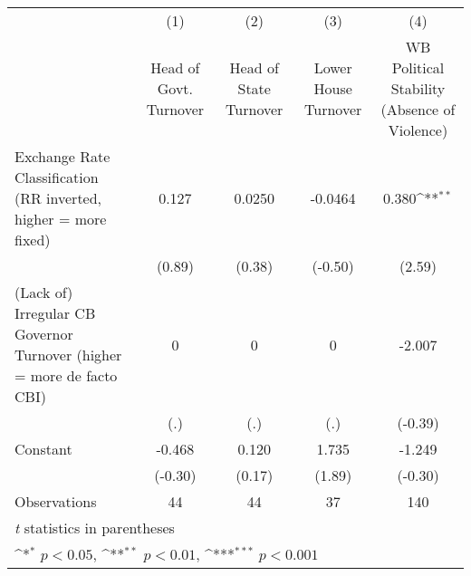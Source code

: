 {
\def\sym#1{\ifmmode^{#1}\else\(^{#1}\)\fi}
\begin{tabular}{l*{4}{c}}
\hline\hline
                &\multicolumn{1}{c}{(1)}&\multicolumn{1}{c}{(2)}&\multicolumn{1}{c}{(3)}&\multicolumn{1}{c}{(4)}\\
                &\multicolumn{1}{c}{Head of Govt. Turnover}&\multicolumn{1}{c}{Head of State Turnover}&\multicolumn{1}{c}{Lower House Turnover}&\multicolumn{1}{c}{WB Political Stability (Absence of Violence)}\\
\hline
Exchange Rate Classification (RR inverted, higher = more fixed)&    0.127         &   0.0250         &  -0.0464         &    0.380\sym{**} \\
                &   (0.89)         &   (0.38)         &  (-0.50)         &   (2.59)         \\
[1em]
(Lack of) Irregular CB Governor Turnover (higher = more de facto CBI)&        0         &        0         &        0         &   -2.007         \\
                &      (.)         &      (.)         &      (.)         &  (-0.39)         \\
[1em]
Constant        &   -0.468         &    0.120         &    1.735         &   -1.249         \\
                &  (-0.30)         &   (0.17)         &   (1.89)         &  (-0.30)         \\
\hline
Observations    &       44         &       44         &       37         &      140         \\
\hline\hline
\multicolumn{5}{l}{\footnotesize \textit{t} statistics in parentheses}\\
\multicolumn{5}{l}{\footnotesize \sym{*} \(p<0.05\), \sym{**} \(p<0.01\), \sym{***} \(p<0.001\)}\\
\end{tabular}
}
